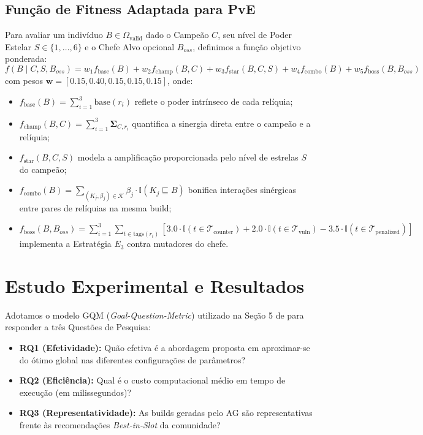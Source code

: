 \documentclass[12pt]{article}
\begin{document}
\subsection{Função de Fitness Adaptada para PvE}

Para avaliar um indivíduo $B \in \Omega_{\text{valid}}$ dado o Campeão $C$, seu nível de Poder Estelar $S \in \{1, \dots, 6\}$ e o Chefe Alvo opcional $B_{oss}$, definimos a função objetivo ponderada:
\begin{equation}
f(B \mid C, S, B_{oss}) = w_1 f_{\text{base}}(B) + w_2 f_{\text{champ}}(B, C) + w_3 f_{\text{star}}(B, C, S) + w_4 f_{\text{combo}}(B) + w_5 f_{\text{boss}}(B, B_{oss})
\end{equation}
com pesos $\mathbf{w} = [0.15, 0.40, 0.15, 0.15, 0.15]$, onde:
\begin{itemize}
    \item $f_{\text{base}}(B) = \sum_{i=1}^3 \text{base}(r_i)$ reflete o poder intrínseco de cada relíquia;
    \item $f_{\text{champ}}(B, C) = \sum_{i=1}^3 \mathbf{\Sigma}_{C, r_i}$ quantifica a sinergia direta entre o campeão e a relíquia;
    \item $f_{\text{star}}(B, C, S)$ modela a amplificação proporcionada pelo nível de estrelas $S$ do campeão;
    \item $f_{\text{combo}}(B) = \sum_{(K_j, \beta_j) \in \mathcal{K}} \beta_j \cdot \mathbb{I}(K_j \sqsubseteq B)$ bonifica interações sinérgicas entre pares de relíquias na mesma build;
    \item $f_{\text{boss}}(B, B_{oss}) = \sum_{i=1}^3 \sum_{t \in \text{tags}(r_i)} [3.0 \cdot \mathbb{I}(t \in \mathcal{T}_{\text{counter}}) + 2.0 \cdot \mathbb{I}(t \in \mathcal{T}_{\text{vuln}}) - 3.5 \cdot \mathbb{I}(t \in \mathcal{T}_{\text{penalized}})]$ implementa a Estratégia $E_3$ contra mutadores do chefe.
\end{itemize}

\section{Estudo Experimental e Resultados}

Adotamos o modelo GQM (\textit{Goal-Question-Metric}) \cite{basili1984} utilizado na Seção 5 de \cite{balbinot2024} para responder a três Questões de Pesquisa:
\begin{itemize}
    \item \textbf{RQ1 (Efetividade):} Quão efetiva é a abordagem proposta em aproximar-se do ótimo global nas diferentes configurações de parâmetros?
    \item \textbf{RQ2 (Eficiência):} Qual é o custo computacional médio em tempo de execução (em milissegundos)?
    \item \textbf{RQ3 (Representatividade):} As builds geradas pelo AG são representativas frente às recomendações \textit{Best-in-Slot} da comunidade?
\end{itemize}
\end{document}
